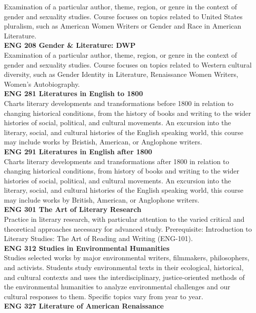 \documentclass[
  letterpaper,
]{scrbook}
\begin{document}
Examination of a particular author, theme, region, or genre in the
context of gender and sexuality studies. Course focuses on topics
related to United States pluralism, such as American Women Writers or
Gender and Race in American Literature.\\
\textbf{ENG 208 Gender \& Literature: DWP}\\
Examination of a particular author, theme, region, or genre in the
context of gender and sexuality studies. Course focuses on topics
related to Western cultural diversity, such as Gender Identity in
Literature, Renaissance Women Writers, Women's Autobiography.\\
\textbf{ENG 281 Literatures in English to 1800}\\
Charts literary developments and transformations before 1800 in relation
to changing historical conditions, from the history of books and writing
to the wider histories of social, political, and cultural movements. An
excursion into the literary, social, and cultural histories of the
English speaking world, this course may include works by Bristish,
American, or Anglophone writers.\\
\textbf{ENG 291 Literatures in English after 1800}\\
Charts literary developments and transformations after 1800 in relation
to changing historical conditions, from history of books and writing to
the wider histories of social, political, and cultural movements. An
excursion into the literary, social, and cultural histories of the
English speaking world, this course may include works by British,
American, or Anglophone writers.\\
\textbf{ENG 301 The Art of Literary Research}\\
Practice in literary research, with particular attention to the varied
critical and theoretical approaches necessary for advanced study.
Prerequisite: Introduction to Literary Studies: The Art of Reading and
Writing (ENG-101).\\
\textbf{ENG 312 Studies in Environmental Humanities}\\
Studies selected works by major environmental writers, filmmakers,
philosophers, and activists. Students study environmental texts in their
ecological, historical, and cultural contexts and uses the
interdisciplinary, justice-oriented methods of the environmental
humanities to analyze environmental challenges and our cultural
responses to them. Specific topics vary from year to year.\\
\textbf{ENG 327 Literature of American Renaissance}\\
\end{document}
